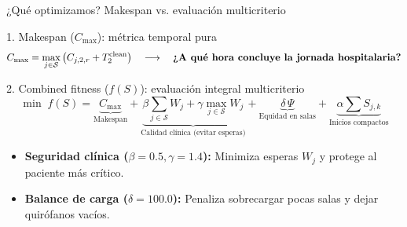 \documentclass[aspectratio=169,11pt]{beamer}
\begin{document}
\begin{frame}{¿Qué optimizamos? Makespan vs. evaluación multicriterio}
  \begin{block}{1. Makespan ($C_{\max}$): métrica temporal pura}
    $$C_{\max} = \max_{j \in \mathcal{S}} \left(C_{j,2,r} + T^{\text{clean}}_2\right) \quad \longrightarrow \quad \text{\textbf{¿A qué hora concluye la jornada hospitalaria?}}$$
  \end{block}

  \vspace{0.15cm}
  \begin{exampleblock}{2. Combined fitness ($f(S)$): evaluación integral multicriterio}
    \small
    $$\min \; f(S) = \underbrace{C_{\max}}_{\text{Makespan}} + \underbrace{\beta \sum_{j \in \mathcal{S}} W_{j} + \gamma \max_{j \in \mathcal{S}} W_{j}}_{\text{Calidad clínica (evitar esperas)}} + \underbrace{\delta\, \Psi}_{\text{Equidad en salas}} + \underbrace{\alpha \sum S_{j,k}}_{\text{Inicios compactos}}$$
    \vspace{-0.2cm}
    \begin{itemize}
      \item \textbf{Seguridad clínica ($\beta=0.5, \gamma=1.4$):} Minimiza esperas $W_j$ y protege al paciente más crítico.
      \item \textbf{Balance de carga ($\delta=100.0$):} Penaliza sobrecargar pocas salas y dejar quirófanos vacíos.
    \end{itemize}
  \end{exampleblock}
\end{frame}
\end{document}
